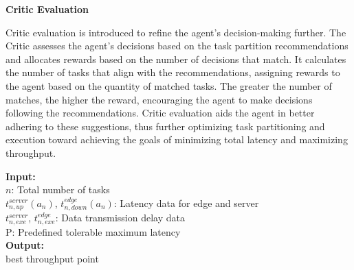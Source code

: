 \documentclass[preprint,12pt]{elsarticle}
\begin{document}
\clearpage

\textbf{Critic Evaluation}

Critic evaluation is introduced to refine the agent's decision-making further. The Critic assesses the agent's decisions based on the task partition recommendations and allocates rewards based on the number of decisions that match. It calculates the number of tasks that align with the recommendations, assigning rewards to the agent based on the quantity of matched tasks. The greater the number of matches, the higher the reward, encouraging the agent to make decisions following the recommendations. Critic evaluation aids the agent in better adhering to these suggestions, thus further optimizing task partitioning and execution toward achieving the goals of minimizing total latency and maximizing throughput.

\begin{algorithm}[H]
\caption{Critic Evaluation via Partition Function}
\textbf{Input:}\\
    $n$: Total number of tasks\\
    $t_{n,up}^{server}(a_n)$, $t_{n,down}^{edge}(a_n)$: Latency data for edge and server\\
    $t_{n,exe}^{server}$, $t_{n,exe}^{edge}$: Data transmission delay data\\
    P: Predefined tolerable maximum latency\\
\textbf{Output:}\\
    best throughput point\\
\end{algorithm}
\end{document}
